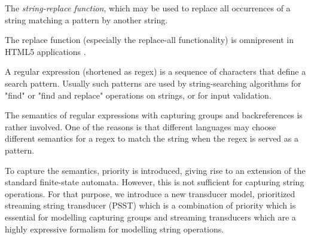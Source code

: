 {%
%
%

The \emph{string-replace function}, 
which may be used to replace all occurrences of a string matching a pattern by 
another string. 

The replace function (especially 
the replace-all functionality) is omnipresent in HTML5 applications
\cite{LB16,TCJ16,YABI14}. 

A regular expression (shortened as regex) is a sequence of characters that define a search pattern. Usually such patterns are used by string-searching algorithms for "find" or "find and replace" operations on strings, or for input validation.  

The semantics of regular expressions with capturing groups and backreferences is rather involved. One of the reasons is that different languages may choose different semantics for a regex to match the string when the regex is served as a pattern. 

To capture the semantics, priority is introduced, giving rise to an extension of the standard finite-state automata. However, this is not sufficient for capturing string operations. For that purpose, we introduce  a new transducer model, prioritized streaming string transducer (PSST) which is a combination of priority which is essential for modelling capturing groups and streaming transducers which are a highly expressive formalism for modelling string operations. 
}
